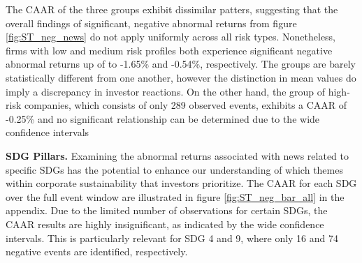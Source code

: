 The CAAR of the three groups exhibit dissimilar patters, suggesting that the overall findings of significant, negative abnormal returns from figure \ref{fig:ST_neg_news} do not apply uniformly across all risk types. Nonetheless, firms with low and medium risk profiles both experience significant negative abnormal returns up of to -1.65\% and -0.54\%, respectively. The groups are barely statistically different from one another, however the distinction in mean values do imply a discrepancy in investor reactions. On the other hand, the group of high-risk companies, which consists of only 289 observed events, exhibits a CAAR of -0.25\% and no significant relationship can be determined due to the wide confidence intervals

\noindent \textbf{SDG Pillars.} Examining the abnormal returns associated with news related to specific SDGs has the potential to enhance our understanding of which themes within corporate sustainability that investors prioritize. The CAAR for each SDG over the full event window are illustrated in figure \ref{fig:ST_neg_bar_all} in the appendix. Due to the limited number of observations for certain SDGs, the CAAR results are highly insignificant, as indicated by the wide confidence intervals. This is particularly relevant for SDG 4 and 9, where only 16 and 74 negative events are identified, respectively. 

